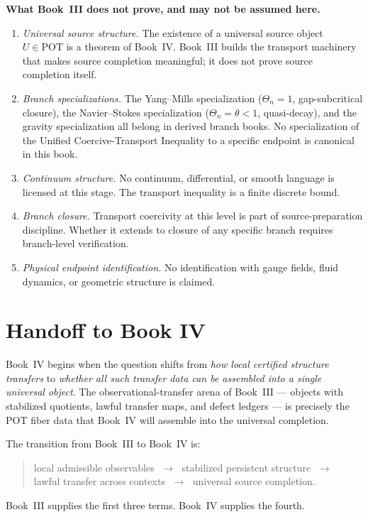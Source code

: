 \documentclass[12pt,oneside]{amsbook}
\theoremstyle{plain}
\theoremstyle{definition}
\theoremstyle{remark}
\begin{document}
\textbf{What Book~III does not prove, and may not be assumed here.}
\begin{enumerate}
  \item \emph{Universal source structure.}  The existence of a
        universal source object $U \in \mathrm{POT}$ is a theorem of
        Book~IV.  Book~III builds the transport machinery that makes
        source completion meaningful; it does not prove source
        completion itself.
  \item \emph{Branch specializations.}  The Yang--Mills
        specialization ($\Theta_n = 1$, gap-subcritical closure),
        the Navier--Stokes specialization ($\Theta_n = \theta < 1$,
        quasi-decay), and the gravity specialization all belong in
        derived branch books.  No specialization of the Unified
        Coercive-Transport Inequality to a specific endpoint is
        canonical in this book.
  \item \emph{Continuum structure.}  No continuum, differential, or
        smooth language is licensed at this stage.  The transport
        inequality is a finite discrete bound.
  \item \emph{Branch closure.}  Transport coercivity at this level is
        part of source-preparation discipline.  Whether it extends to
        closure of any specific branch requires branch-level
        verification.
  \item \emph{Physical endpoint identification.}  No identification
        with gauge fields, fluid dynamics, or geometric structure is
        claimed.
\end{enumerate}

\section{Handoff to Book IV}

Book~IV begins when the question shifts from \emph{how local certified
structure transfers} to \emph{whether all such transfer data can be
assembled into a single universal object}.  The observational-transfer
arena of Book~III --- objects with stabilized quotients, lawful
transfer maps, and defect ledgers --- is precisely the POT fiber data
that Book~IV will assemble into the universal completion.

The transition from Book~III to Book~IV is:
\begin{quote}
  local admissible observables
  $\;\longrightarrow\;$
  stabilized persistent structure
  $\;\longrightarrow\;$
  lawful transfer across contexts
  $\;\longrightarrow\;$
  universal source completion.
\end{quote}
Book~III supplies the first three terms.  Book~IV supplies the fourth.
\end{document}
